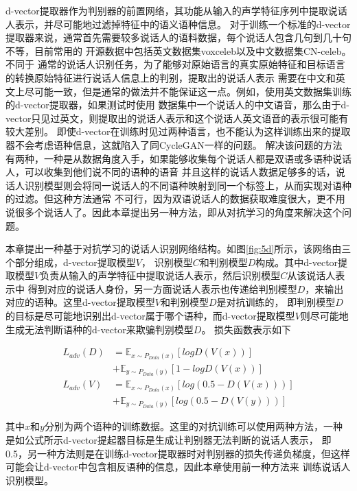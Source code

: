 d-vector提取器作为判别器的前置网络，其功能从输入的声学特征序列中提取说话人表示，并尽可能地过滤掉特征中的语义语种信息。
对于训练一个标准的d-vector提取器来说，通常首先需要较多说话人的语料数据，每个说话人包含几句到几十句不等，目前常用的
开源数据中包括英文数据集voxceleb\cite{nagrani2017voxceleb}以及中文数据集CN-celeb\cite{fan2019cn}。不同于
通常的说话人识别任务，为了能够对原始语言的真实原始特征和目标语言的转换原始特征进行说话人信息上的判别，提取出的说话人表示
需要在中文和英文上尽可能一致，但是通常的做法并不能保证这一点。例如，使用英文数据集训练的d-vector提取器，如果测试时使用
数据集中一个说话人的中文语音，那么由于d-vector只见过英文，则提取出的说话人表示和这个说话人英文语音的表示很可能有较大差别。
即使d-vector在训练时见过两种语言，也不能认为这样训练出来的提取器不会考虑语种信息，这就陷入了同CycleGAN一样的问题。
解决该问题的方法有两种，一种是从数据角度入手，如果能够收集每个说话人都是双语或多语种说话人，可以收集到他们说不同的语种的语音
并且这样的说话人数据足够多的话，说话人识别模型则会将同一说话人的不同语种映射到同一个标签上，从而实现对语种的过滤。但这种方法通常
不可行，因为双语说话人的数据获取难度很大，更不用说很多个说话人了。因此本章提出另一种方法，即从对抗学习的角度来解决这个问题。

本章提出一种基于对抗学习的说话人识别网络结构。如图\ref{fig:5d}所示，该网络由三个部分组成，d-vector提取模型$V$，
识别模型$C$和判别模型$D$构成。其中d-vector提取模型$V$负责从输入的声学特征中提取说话人表示，然后识别模型$C$从该说话人表示中
得到对应的说话人身份，另一方面说话人表示也传递给判别模型$D$，来输出对应的语种。这里d-vector提取模型$V$和判别模型$D$是对抗训练的，
即判别模型$D$的目标是尽可能地识别出d-vector属于哪个语种，而d-vector提取模型$V$则尽可能地生成无法判断语种的d-vector来欺骗判别模型$D$。
损失函数表示如下


\begin{align}
    L_{adv}(D) & =\mathbb{E}_{x\sim P_{Data}(x)}\left[log D(V(x))\right] \\
               & +\mathbb{E}_{y\sim P_{Data}(y)}\left[1-log D(V(x))\right]\\
    L_{adv}(V) & =\mathbb{E}_{x\sim P_{Data}(x)}\left[log (0.5-D(V(x)))\right] \\
               & +\mathbb{E}_{y\sim P_{Data}(y)}\left[log (0.5-D(V(y)))\right]
\end{align}

其中$x$和$y$分别为两个语种的训练数据。这里的对抗训练可以使用两种方法，一种是如公式所示d-vector提起器目标是生成让判别器无法判断的说话人表示，
即0.5，另一种方法则是在训练d-vector提取器时对判别器的损失传递负梯度，但这样可能会让d-vector中包含相反语种的信息，因此本章使用前一种方法来
训练说话人识别模型。

